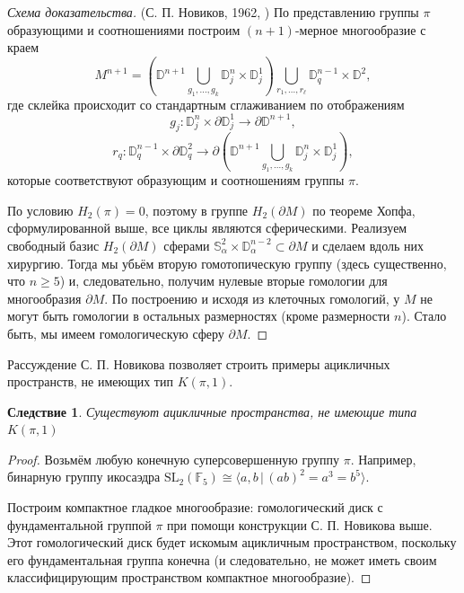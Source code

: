 \documentclass[14pt, dvipsnames, twoside]{extarticle}
\newtheorem{corollary}{Следствие}[theorem]
\theoremstyle{definition}
\theoremstyle{remark}
\newtheorem*{comment}{Замечание}
\begin{document}
\begin{proof}[Схема доказательства] (С. П. Новиков, 1962, \cite{Novikov}) 
По представлению группы $\pi$ образующими и соотношениями построим $(n+1)$-мерное многообразие с краем $$M^{n+1}=\left ( \mathbb{D}^{n+1}\bigcup\limits_{g_1, ..., g_k} \mathbb{D}^{n}_j\times \mathbb{D}^1_j \right )\bigcup\limits_{r_1, ..., r_{\ell}}\mathbb{D}^{n-1}_q\times\mathbb{D}^2,$$ где склейка происходит со стандартным сглаживанием по отображениям $$g_j: \mathbb{D}^n_j\times\partial\mathbb{D}^1_j\to \partial\mathbb{D}^{n+1},$$ $$r_q: \mathbb{D}^{n-1}_q\times\partial\mathbb{D}^2_q\to\partial\left (\mathbb{D}^{n+1}\bigcup\limits_{g_1, ..., g_k}\mathbb{D}^n_j\times\mathbb{D}^1_j \right ),$$ которые соответствуют образующим и соотношениям группы $\pi$.

По условию $H_2(\pi)=0$, поэтому в группе $H_2(\partial M)$ по теореме Хопфа, сформулированной выше, все циклы являются сферическими. Реализуем свободный базис $H_2(\partial M)$ сферами $\mathbb{S}^2_\alpha\times\mathbb{D}^{n-2}_\alpha\subset\partial M$ и сделаем вдоль них хирургию. Тогда мы убьём вторую гомотопическую группу (здесь существенно, что $n\geqslant 5$) и, следовательно, получим нулевые вторые гомологии для многообразия $\partial M$. По построению и исходя из клеточных гомологий, у $M$ не могут быть гомологии в остальных размерностях (кроме размерности $n$). Стало быть, мы имеем гомологическую сферу $\partial M$.
\end{proof}

Рассуждение С. П. Новикова позволяет строить примеры ацикличных пространств, не имеющих тип $K(\pi, 1)$. 

\begin{corollary}
Существуют ацикличные пространства, не имеющие типа $K(\pi, 1)$ 
\end{corollary}

\begin{proof}

Возьмём любую конечную суперсовершенную группу $\pi$. Например, бинарную группу икосаэдра $\mathrm{SL}_2(\mathbb{F}_5) \cong \langle a, b\, |\, (ab)^2 = a^3 = b^5 \rangle$.

Построим компактное гладкое многообразие: гомологический диск с фундаментальной группой $\pi$ при помощи конструкции С. П. Новикова выше. Этот гомологический диск будет искомым ацикличным пространством, поскольку его фундаментальная группа конечна (и следовательно, не может иметь своим классифицирующим пространством компактное многообразие). 

\end{proof}
\end{document}
